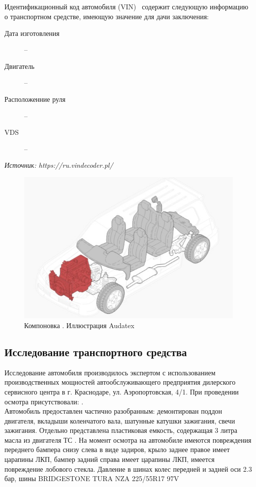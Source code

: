 	\subparagraph*{} Идентификационный код автомобиля (VIN) \vin\, содержит следующую информацию о транспортном средстве, имеющую значение для 	дачи заключения:
%
\begin{description}
%		
	\item[Дата изготовления] --
	\item[Двигатель] --
	\item [Расположенние руля] --
	\item[VDS] --
	
		\end{description}

%
\textit{Источник: https://ru.vindecoder.pl/\vin}
%
  \begin{figure}[!h]
	\centering
	\includegraphics[width=0.65\linewidth]{images/cm1}
	\caption{{\footnotesize {Компоновка . Иллюстрация Audatex}}}
	\label{ris:images/cm1}
\end{figure}



\subsection{Исследование транспортного средства}
%
Исследование автомобиля производилось экспертом с использованием производственных мощностей автообслуживающего предприятия дилерского сервисного центра в г. Краснодаре, ул. Аэропортовская, 4/1. При проведении осмотра присутствовали: . \\
Автомобиль предоставлен частично разобранным: демонтирован поддон двигателя, вкладыши коленчатого вала, шатунные катушки зажигания, свечи зажигания.  Отдельно представлена пластиковая емкость, содержащая 3 литра масла из двигателя ТС .
На момент осмотра на автомобиле имеются повреждения переднего бампера снизу слева в виде задиров, крыло заднее правое  имеет царапины ЛКП, бампер задний справа имеет царапины ЛКП, имеется повреждение лобового стекла. Давление в шинах колес передней и задней оси 2.3 бар, шины BRIDGESTONE TURA NZA 225/55R17 97V



